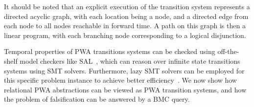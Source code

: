 It should be noted that an explicit execution of the transition system
represents a directed acyclic graph, with each location being a node,
and a directed edge from each node to all nodes reachable in forward
time. A path on this graph is then a linear program, with each
branching node corresponding to a logical disjunction.

Temporal properties of PWA transitions systems can be checked using
off-the-shelf model checkers like SAL~\cite{SAL-SRI}, which can reason
over infinite state transitions systems using SMT solvers.
Furthermore, lazy SMT solvers can be employed for this specific
problem instance to achieve better efficiency~\cite{shoukry2017smc}.
We now show how relational PWA abstractions can be viewed as PWA
transition systems, and how the problem of falsification can
be answered by a BMC query.

